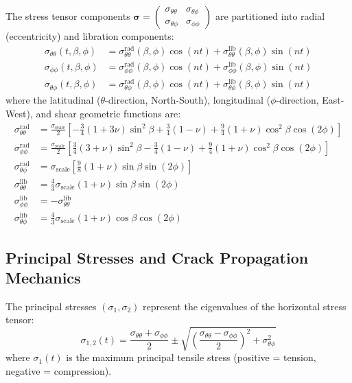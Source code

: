 \documentclass[11pt,a4paper]{article}
\begin{document}
The stress tensor components $\boldsymbol{\sigma} = \begin{pmatrix} \sigma_{\theta\theta} & \sigma_{\theta\phi} \\ \sigma_{\theta\phi} & \sigma_{\phi\phi} \end{pmatrix}$ are partitioned into radial (eccentricity) and libration components:
\begin{align}
\sigma_{\theta\theta}(t, \beta, \phi) &= \sigma_{\theta\theta}^{\mathrm{rad}}(\beta, \phi) \cos(nt) + \sigma_{\theta\theta}^{\mathrm{lib}}(\beta, \phi) \sin(nt) \\
\sigma_{\phi\phi}(t, \beta, \phi) &= \sigma_{\phi\phi}^{\mathrm{rad}}(\beta, \phi) \cos(nt) + \sigma_{\phi\phi}^{\mathrm{lib}}(\beta, \phi) \sin(nt) \\
\sigma_{\theta\phi}(t, \beta, \phi) &= \sigma_{\theta\phi}^{\mathrm{rad}}(\beta, \phi) \cos(nt) + \sigma_{\theta\phi}^{\mathrm{lib}}(\beta, \phi) \sin(nt)
\end{align}
where the latitudinal ($\theta$-direction, North-South), longitudinal ($\phi$-direction, East-West), and shear geometric functions are:
\begin{align}
\sigma_{\theta\theta}^{\mathrm{rad}} &= \frac{\sigma_{\mathrm{scale}}}{2} \left[ -\frac{3}{4}(1+3\nu)\sin^2\beta + \frac{3}{4}(1-\nu) + \frac{9}{4}(1+\nu)\cos^2\beta\cos(2\phi) \right] \\
\sigma_{\phi\phi}^{\mathrm{rad}} &= \frac{\sigma_{\mathrm{scale}}}{2} \left[ \frac{3}{4}(3+\nu)\sin^2\beta - \frac{3}{4}(1-\nu) + \frac{9}{4}(1+\nu)\cos^2\beta\cos(2\phi) \right] \\
\sigma_{\theta\phi}^{\mathrm{rad}} &= \sigma_{\mathrm{scale}} \left[ \frac{9}{8}(1+\nu)\sin\beta\sin(2\phi) \right] \\
\sigma_{\theta\theta}^{\mathrm{lib}} &= \frac{4}{3}\sigma_{\mathrm{scale}} (1+\nu)\sin\beta\sin(2\phi) \\
\sigma_{\phi\phi}^{\mathrm{lib}} &= -\sigma_{\theta\theta}^{\mathrm{lib}} \\
\sigma_{\theta\phi}^{\mathrm{lib}} &= \frac{4}{3}\sigma_{\mathrm{scale}} (1+\nu)\cos\beta\cos(2\phi)
\end{align}

\subsection{Principal Stresses and Crack Propagation Mechanics}
The principal stresses $(\sigma_1, \sigma_2)$ represent the eigenvalues of the horizontal stress tensor:
\begin{equation}
\sigma_{1, 2}(t) = \frac{\sigma_{\theta\theta} + \sigma_{\phi\phi}}{2} \pm \sqrt{\left(\frac{\sigma_{\theta\theta} - \sigma_{\phi\phi}}{2}\right)^2 + \sigma_{\theta\phi}^2}
\end{equation}
where $\sigma_1(t)$ is the maximum principal tensile stress (positive = tension, negative = compression). 
\end{document}
